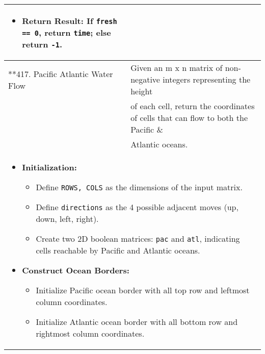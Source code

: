 \begin{summary}
\begin{center}
\begin{tabular}{ll}
{\begin{itemize}
\begin{itemize}
                    \end{itemize}
                    \item \textbf{Return Result:} If \texttt{fresh == 0}, return \texttt{time}; else return \texttt{-1}.
                \end{itemize}                
            } \\
            \midrule
            **417. Pacific Atlantic Water Flow & Given an m x n matrix of non-negative integers representing the height \\
            & of each cell, return the coordinates of cells that can flow to both the Pacific \& \\
            & Atlantic oceans. \\
            \multicolumn{2}{p{\linewidth}}{
                \begin{itemize}
                    \item \textbf{Initialization:}
                    \begin{itemize}
                        \item Define \texttt{ROWS, COLS} as the dimensions of the input matrix.
                        \item Define \texttt{directions} as the 4 possible adjacent moves (up, down, left, right).
                        \item Create two 2D boolean matrices: \texttt{pac} and \texttt{atl}, indicating cells reachable by Pacific and Atlantic oceans. 
                    \end{itemize}
                
                    \item \textbf{Construct Ocean Borders:}
                    \begin{itemize}
                        \item Initialize Pacific ocean border with all top row and leftmost column coordinates.
                        \item Initialize Atlantic ocean border with all bottom row and rightmost column coordinates.
                    \end{itemize}
                

\end{itemize}}
\end{tabular}
\end{center}
\end{summary}

